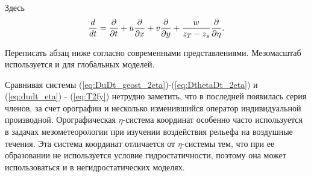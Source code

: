 Здесь 
    \begin{equation*}
        \displaystyle\frac{d }{d t}=\displaystyle\frac{\partial }{\partial t} + u\displaystyle\frac{\partial }{\partial x} + v\displaystyle\frac{\partial }{\partial y} + \frac{w}{z_T-z_s}\displaystyle\frac{\partial }{\partial \eta}.
    \end{equation*}
   \begin{warn}
        Переписать абзац ниже согласно современными представлениями. Мезомасштаб используется и для глобальных моделей. 
   \end{warn}
Сравнивая системы (\ref{eq:DuDt_geost_2eta})-(\ref{eq:DthetaDt_2eta}) и (\ref{eq:dudt_eta}) - (\ref{eq:T2fy}) нетрудно заметить, что в последней появилась серия членов, за счет орографии и несколько изменившийся оператор индивидуальной производной. Орографическая $\eta$-система координат особенно часто используется в задачах мезометеорологии при изучении
воздействия рельефа на воздушные течения. Эта система координат отличается от $\eta$-системы тем, что при ее образовании не используется условие гидростатичности, поэтому она может использоваться и в негидростатических моделях. 

% 
    
